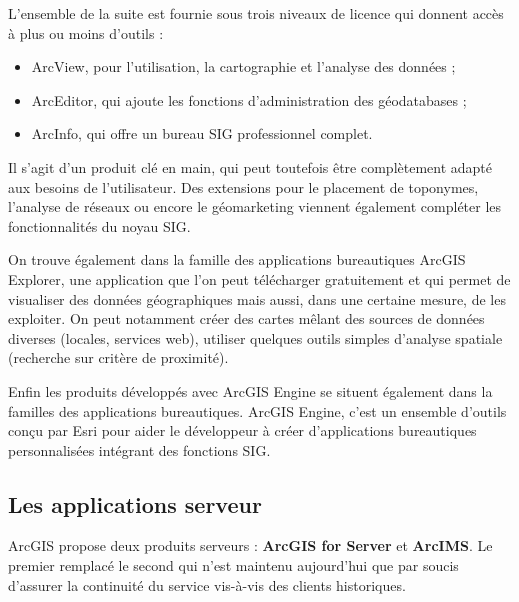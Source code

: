 \documentclass[11pt]{article}
\begin{document}
L'ensemble de la suite est fournie sous trois niveaux de licence qui donnent accès à plus ou moins d'outils :
\begin{itemize}
	\item ArcView, pour l'utilisation, la cartographie et l'analyse des données ; 
	\item ArcEditor, qui ajoute les fonctions d'administration des géodatabases ;
	\item ArcInfo, qui offre un bureau SIG professionnel complet.
\end{itemize} 

Il s'agit d'un produit clé en main, qui peut toutefois être complètement adapté aux besoins de l'utilisateur. Des extensions pour le placement de toponymes, l'analyse de réseaux ou encore le géomarketing viennent également compléter les fonctionnalités du noyau SIG.

\begin{center}
\end{center}

On trouve également dans la famille des applications bureautiques ArcGIS Explorer, une application que l'on peut télécharger gratuitement et qui permet de visualiser des données géographiques mais aussi, dans une certaine mesure, de les exploiter. On peut notamment créer des cartes mêlant des sources de données diverses (locales, services web), utiliser quelques outils simples d'analyse spatiale (recherche sur critère de proximité).

Enfin les produits développés avec ArcGIS Engine se situent également dans la familles des applications bureautiques. ArcGIS Engine, c'est un ensemble d'outils conçu par Esri pour aider le développeur à créer d'applications bureautiques personnalisées intégrant des fonctions SIG.


\subsection{Les applications serveur}
ArcGIS propose deux produits serveurs : \textbf{ArcGIS for Server} et \textbf{ArcIMS}. Le premier remplacé le second qui n'est maintenu aujourd'hui que par soucis d'assurer la continuité du service vis-à-vis des clients historiques. 
\end{document}

